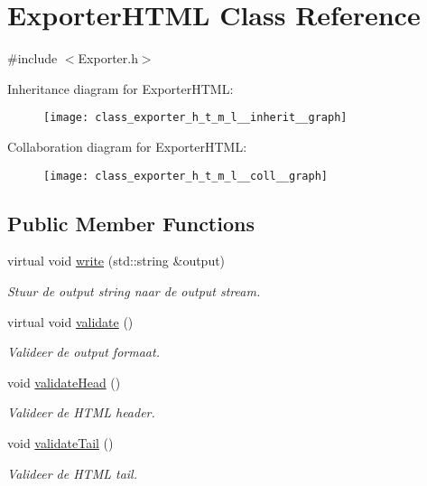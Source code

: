 \hypertarget{class_exporter_h_t_m_l}{}\section{Exporter\+H\+T\+ML Class Reference}
\label{class_exporter_h_t_m_l}


{\ttfamily \#include $<$Exporter.\+h$>$}



Inheritance diagram for Exporter\+H\+T\+ML\+:
\nopagebreak
\begin{figure}[H]
\begin{center}
\leavevmode
\texttt{[image: class\_exporter\_h\_t\_m\_l\_\_inherit\_\_graph]}
\end{center}
\end{figure}


Collaboration diagram for Exporter\+H\+T\+ML\+:
\nopagebreak
\begin{figure}[H]
\begin{center}
\leavevmode
\texttt{[image: class\_exporter\_h\_t\_m\_l\_\_coll\_\_graph]}
\end{center}
\end{figure}
\subsection*{Public Member Functions}
\begin{DoxyCompactItemize}
\item 
virtual void \hyperlink{class_exporter_h_t_m_l_aa5b12621501f09a9a082e9337fbf943c}{write} (std\+::string \&output)
\begin{DoxyCompactList}\small\item\em Stuur de output string naar de output stream. \end{DoxyCompactList}\item 
virtual void \hyperlink{class_exporter_h_t_m_l_a60518b938e3cddd92ce3218de3651ac4}{validate} ()
\begin{DoxyCompactList}\small\item\em Valideer de output formaat. \end{DoxyCompactList}\item 
void \hyperlink{class_exporter_h_t_m_l_a2d9bb5e5f68a9e6111d8a929eb4a042e}{validate\+Head} ()
\begin{DoxyCompactList}\small\item\em Valideer de H\+T\+ML header. \end{DoxyCompactList}\item 
void \hyperlink{class_exporter_h_t_m_l_ab9d3ebcfa054f02f08ab34e1a6298963}{validate\+Tail} ()
\begin{DoxyCompactList}\small\item\em Valideer de H\+T\+ML tail. \end{DoxyCompactList}\end{DoxyCompactItemize}


